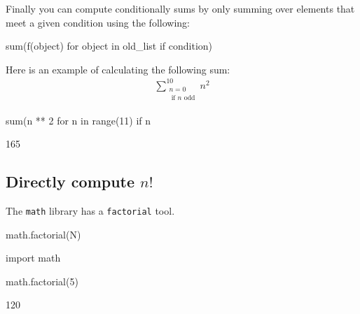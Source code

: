 Finally you can compute conditionally sums by only summing over elements that
meet a given condition using the following:

\begin{pyin}
sum(f(object) for object in old_list if condition)
\end{pyin}


Here is an example of calculating the following sum:
\begin{equation*}
\begin{split}
    \sum_{\begin{array}{c}n=0\\\text{ if }n\text{ odd}\end{array}}^{10} n ^ 2
\end{split}
\end{equation*}



\begin{pyin}
sum(n ** 2 for n in range(11) if n %
\end{pyin}





\begin{raw}
165
\end{raw}





\subsection{Directly compute \(n!\)}
\label{\detokenize{tools-for-mathematics/05-combinations-permutations/how/main:directly-computing-n}}

The \texttt{math} library has a \texttt{factorial} tool.


\begin{pyin}
math.factorial(N)
\end{pyin}





\begin{pyin}
import math

math.factorial(5)
\end{pyin}





\begin{raw}
120
\end{raw}






